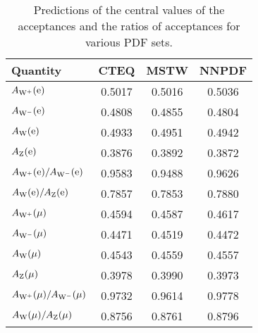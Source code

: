 \begin{table}[htb] %
\begin{center}
\caption{Predictions of the central values of the acceptances and the ratios of 
acceptances for various PDF sets. }
\label{tab:pdfAcc}
\begin{tabular}{| l | c | c | c |}
\hline
\centering Quantity & CTEQ & MSTW &  NNPDF  \\
\hline
\hline
$A_{\mathrm{W^+}}(\mathrm{e})$ & 0.5017 & 0.5016 & 0.5036 \\
$A_{\mathrm{W^-}}(\mathrm{e})$ & 0.4808 & 0.4855 & 0.4804 \\
$A_{\mathrm{W}}(\mathrm{e})$ & 0.4933 & 0.4951 & 0.4942 \\
$A_{\mathrm{Z}}(\mathrm{e})$ & 0.3876 & 0.3892 & 0.3872 \\
$A_{\mathrm{W^+}}(\mathrm{e})/A_{\mathrm{W^-}}(\mathrm{e})$ & 0.9583 & 0.9488 & 0.9626 \\
$A_{\mathrm{W}}(\mathrm{e})/A_{\mathrm{Z}}(\mathrm{e})$ & 0.7857 & 0.7853 & 0.7880 \\
\hline
$A_{\mathrm{W^+}}(\mu)$ & 0.4594 & 0.4587 & 0.4617 \\
$A_{\mathrm{W^-}}(\mu)$ & 0.4471 & 0.4519 & 0.4472 \\
$A_{\mathrm{W}}(\mu)$ & 0.4543 & 0.4559 & 0.4557 \\
$A_{\mathrm{Z}}(\mu)$ & 0.3978 & 0.3990 & 0.3973 \\
$A_{\mathrm{W^+}}(\mu)/A_{\mathrm{W^-}}(\mu)$ & 0.9732 & 0.9614 & 0.9778 \\
$A_{\mathrm{W}}(\mu)/A_{\mathrm{Z}}(\mu)$ & 0.8756 & 0.8761 & 0.8796 \\
\hline
\end{tabular}
\end{center}
\end{table}

